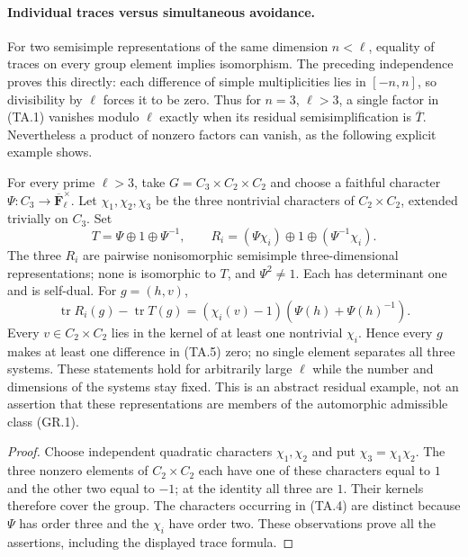 \paragraph{Individual traces versus simultaneous avoidance.}
For two semisimple representations of the same dimension
$n<\ell$, equality of traces on every group element implies
isomorphism. The preceding independence proves this directly:
each difference of simple multiplicities lies in $[-n,n]$,
so divisibility by $\ell$ forces it to be zero. Thus for
$n=3$, $\ell>3$, a single factor in (TA.1) vanishes modulo
$\ell$ exactly when its residual semisimplification is
$\overline T$. Nevertheless a product of nonzero factors
can vanish, as the following explicit example shows.

\begin{example}
For every prime $\ell>3$, take
$G=C_3\times C_2\times C_2$ and choose a faithful character
$\Psi:C_3\to\overline{\mathbf F}_\ell^\times$.
Let $\chi_1,\chi_2,\chi_3$ be the three nontrivial
characters of $C_2\times C_2$, extended trivially on $C_3$.
Set
\[
 T=\Psi\oplus1\oplus\Psi^{-1},\qquad
 R_i=(\Psi\chi_i)\oplus1\oplus(\Psi^{-1}\chi_i).
                                                               \tag{TA.4}
\]
The three $R_i$ are pairwise nonisomorphic semisimple
three-dimensional representations; none is isomorphic to
$T$, and $\Psi^2\ne1$. Each has determinant one and is
self-dual. For $g=(h,v)$,
\[
 \operatorname{tr}R_i(g)-\operatorname{tr}T(g)
       =(\chi_i(v)-1)(\Psi(h)+\Psi(h)^{-1}).
                                                               \tag{TA.5}
\]
Every $v\in C_2\times C_2$ lies in the kernel of at least
one nontrivial $\chi_i$. Hence every $g$ makes at least
one difference in (TA.5) zero; no single element separates
all three systems. These statements hold for arbitrarily
large $\ell$ while the number and dimensions of the
systems stay fixed. This is an abstract residual example,
not an assertion that these representations are members
of the automorphic admissible class (GR.1).
\end{example}

\begin{proof}
Choose independent quadratic characters $\chi_1,\chi_2$
and put $\chi_3=\chi_1\chi_2$. The three nonzero elements
of $C_2\times C_2$ each have one of these characters equal
to $1$ and the other two equal to $-1$; at the identity
all three are $1$. Their kernels therefore cover the
group. The characters occurring in (TA.4) are distinct
because $\Psi$ has order three and the $\chi_i$ have
order two. These observations prove all the assertions,
including the displayed trace formula.
\end{proof}

